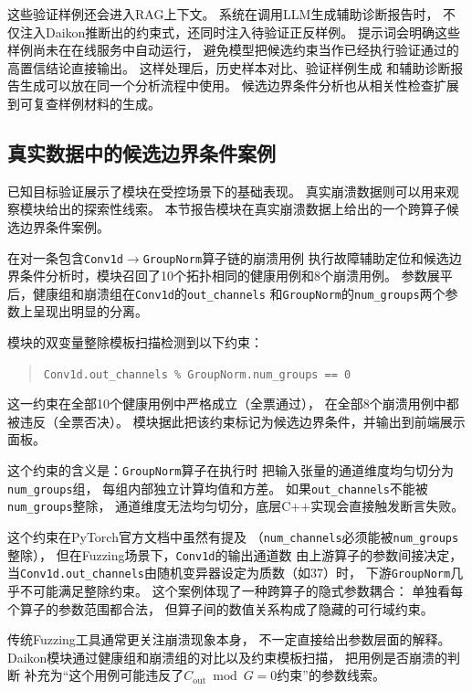 这些验证样例还会进入RAG上下文。
系统在调用LLM生成辅助诊断报告时，
不仅注入Daikon推断出的约束式，还同时注入待验证正反样例。
提示词会明确这些样例尚未在在线服务中自动运行，
避免模型把候选约束当作已经执行验证通过的高置信结论直接输出。
这样处理后，历史样本对比、验证样例生成
和辅助诊断报告生成可以放在同一个分析流程中使用。
候选边界条件分析也从相关性检查扩展到可复查样例材料的生成。

\subsection{真实数据中的候选边界条件案例}

已知目标验证展示了模块在受控场景下的基础表现。
真实崩溃数据则可以用来观察模块给出的探索性线索。
本节报告模块在真实崩溃数据上给出的一个跨算子候选边界条件案例。

在对一条包含\texttt{Conv1d}$\to$\texttt{GroupNorm}算子链的崩溃用例
执行故障辅助定位和候选边界条件分析时，模块召回了10个拓扑相同的健康用例和8个崩溃用例。
参数展平后，健康组和崩溃组在\texttt{Conv1d}的\texttt{out\_channels}
和\texttt{GroupNorm}的\texttt{num\_groups}两个参数上呈现出明显的分离。

模块的双变量整除模板扫描检测到以下约束：

\begin{quote}
\texttt{Conv1d.out\_channels \% GroupNorm.num\_groups == 0}
\end{quote}

这一约束在全部10个健康用例中严格成立（全票通过），
在全部8个崩溃用例中都被违反（全票否决）。
模块据此把该约束标记为候选边界条件，并输出到前端展示面板。

这个约束的含义是：\texttt{GroupNorm}算子在执行时
把输入张量的通道维度均匀切分为\texttt{num\_groups}组，
每组内部独立计算均值和方差。
如果\texttt{out\_channels}不能被\texttt{num\_groups}整除，
通道维度无法均匀切分，底层C++实现会直接触发断言失败。

这个约束在PyTorch官方文档中虽然有提及
（\texttt{num\_channels}必须能被\texttt{num\_groups}整除），
但在Fuzzing场景下，\texttt{Conv1d}的输出通道数
由上游算子的参数间接决定，
当\texttt{Conv1d.out\_channels}由随机变异器设定为质数（如37）时，
下游\texttt{GroupNorm}几乎不可能满足整除约束。
这个案例体现了一种跨算子的隐式参数耦合：
单独看每个算子的参数范围都合法，
但算子间的数值关系构成了隐藏的可行域约束。

传统Fuzzing工具通常更关注崩溃现象本身，
不一定直接给出参数层面的解释。
Daikon模块通过健康组和崩溃组的对比以及约束模板扫描，
把用例是否崩溃的判断
补充为“这个用例可能违反了$C_{\text{out}} \bmod G = 0$约束”的参数线索。

